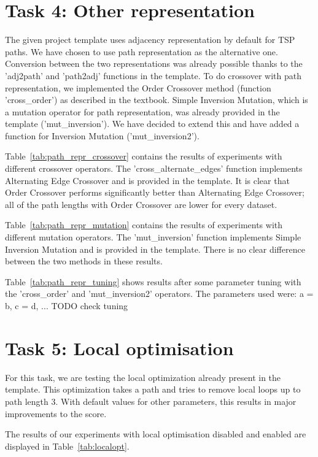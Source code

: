 \documentclass{report}
\begin{document}
\section{Task 4: Other representation}
The given project template uses adjacency representation by default for TSP paths. We have chosen to use path representation as the alternative one. Conversion between the two representations was already possible thanks to the 'adj2path' and 'path2adj' functions in the template. To do crossover with path representation, we implemented the Order Crossover method (function 'cross\_order') as described in the textbook. Simple Inversion Mutation, which is a mutation operator for path representation, was already provided in the template ('mut\_inversion'). We have decided to extend this and have added a function for Inversion Mutation ('mut\_inversion2').

Table~\ref{tab:path_repr_crossover} contains the results of experiments with different crossover operators. The 'cross\_alternate\_edges' function implements Alternating Edge Crossover and is provided in the template. It is clear that Order Crossover performs significantly better than Alternating Edge Crossover; all of the path lengths with Order Crossover are lower for every dataset.


Table~\ref{tab:path_repr_mutation} contains the results of experiments with different mutation operators. The 'mut\_inversion' function implements Simple Inversion Mutation and is provided in the template. There is no clear difference between the two methods in these results.


Table~\ref{tab:path_repr_tuning} shows results after some parameter tuning with the 'cross\_order' and 'mut\_inversion2' operators. The parameters used were: a = b, c = d, ... TODO  check tuning




\section{Task 5: Local optimisation}
\label{sec:local}
For this task, we are testing the local optimization already present in the template. This optimization takes a path and tries to remove local loops up to path length 3. With default values for other parameters, this results in major improvements to the score.

The results of our experiments with local optimisation disabled and enabled are displayed in Table~\ref{tab:localopt}.
\end{document}
